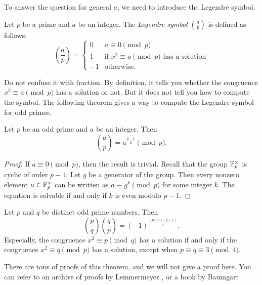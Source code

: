 To answer the question for general $a$, we need to introduce the Legendre symbol.
\begin{definition}
    Let $p$ be a prime and $a$ be an integer.
    The \emph{Legendre symbol} $\left(\frac{a}{p}\right)$ is defined as follows:
    \begin{equation}
        \left(\frac{a}{p}\right) = \begin{cases}
            0 & a \equiv 0 \pmod{p} \\
            1 & \text{if } x^2 \equiv a \pmod{p} \text{ has a solution} \\
            -1 & \text{otherwise.}
        \end{cases}
        \label{eqn:legendre-symbol}
    \end{equation}
\end{definition}

Do not confuse it with fraction.
By definition, it tells you whether the congruence $x^2 \equiv a \pmod{p}$ has a solution or not.
But it does not tell you how to compute the symbol.
The following theorem gives a way to compute the Legendre symbol for odd primes.
\begin{theorem}
    \label{thm:euler-criterion}
    Let $p$ be an odd prime and $a$ be an integer.
    Then
    \begin{equation}
        \left(\frac{a}{p}\right) = a^{\frac{p - 1}{2}} \pmod{p}.
        \label{eqn:euler-criterion}
    \end{equation}
\end{theorem}
\begin{proof}
    If $a \equiv 0 \pmod{p}$, then the result is trivial.
    Recall that the group $\mathbb{F}_p^\times$ is cyclic of order $p - 1$.
    Let $g$ be a generator of the group.
    Then every nonzero element $a \in \mathbb{F}_p^\times$ can be written as $a \equiv g^k \pmod{p}$ for some integer $k$.
    The equation is solvable if and only if $k$ is even modulo $p - 1$.
\end{proof}

\begin{theorem}
    \label{thm:quadratic-reciprocity}
    Let $p$ and $q$ be distinct odd prime numbers.
    Then
    \begin{equation}
        \left(\frac{p}{q}\right) \left(\frac{q}{p}\right) = (-1)^{\frac{(p-1)(q-1)}{4}}.
        \label{eqn:quadratic-reciprocity}
    \end{equation}
    Especially, the congruence $x^2 \equiv p \pmod{q}$ has a solution if and only if the congruence $x^2 \equiv q \pmod{p}$ has a solution, except when $p \equiv q \equiv 3 \pmod{4}$. 
\end{theorem}
There are tons of proofs of this theorem, and we will not give a proof here.
You can refer to an archive of proofs by Lemmermeyer \cite{lemmermeyer_qr}, or a book by Baumgart \cite{baumgart2015quadratic}.

